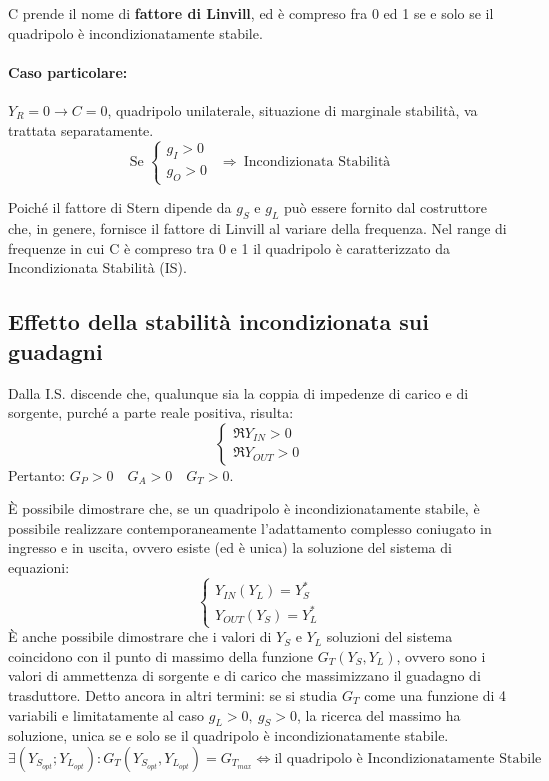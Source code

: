 C prende il nome di  \textbf{fattore di Linvill}, ed è compreso fra 0 ed 1 se e solo se il quadripolo è incondizionatamente stabile.

\paragraph{Caso particolare:} $Y_R =0 \rightarrow C=0$, quadripolo unilaterale,	situazione di marginale stabilità, va trattata separatamente.
$$
\mbox{Se }
\begin{cases}
g_I > 0 \\
g_O > 0
\end{cases}
~~
\Rightarrow
~
\mbox{Incondizionata Stabilità}
$$

	
Poiché il fattore di Stern dipende da $g_S$ e $g_L$ può essere fornito dal costruttore che, in genere,	fornisce il fattore di Linvill al variare della frequenza. Nel range di frequenze in cui C è compreso tra 0 e 1 il quadripolo è caratterizzato da Incondizionata Stabilità (IS).

\subsection{Effetto della stabilità incondizionata sui guadagni}

Dalla I.S. discende che, qualunque sia la coppia di impedenze di carico e di sorgente, purché a parte
reale positiva, risulta:
\[
\begin{cases}
\Re{ Y_{IN} } > 0\\
\Re{ Y_{OUT} } > 0
\end{cases}
\]
Pertanto: $ G_P > 0 \quad G_A > 0 \quad G_T > 0$.

È possibile dimostrare che, se un quadripolo è incondizionatamente stabile, è possibile realizzare contemporaneamente l'adattamento complesso coniugato in ingresso e in uscita, ovvero esiste (ed è unica) la soluzione del sistema di equazioni:
\[
\begin{cases}
Y_{IN} ( Y_L ) = Y_S^*\\
Y_{OUT} ( Y_S ) = Y_L^*
\end{cases}
\]
È anche possibile dimostrare che i valori di $Y_S$ e $Y_L$ soluzioni del sistema coincidono con il punto di massimo della funzione $G_T (Y_S, Y_L)$, ovvero sono i valori di ammettenza di sorgente e di carico che massimizzano il guadagno di trasduttore.
Detto ancora in altri termini: se si studia $G_T$ come una funzione di 4 variabili e limitatamente al caso $g_L >0,~ g_S >0$, la ricerca del massimo ha soluzione, unica se e solo se il quadripolo è incondizionatamente stabile.
\[\exists (Y_{S_{opt}}; Y_{L_{opt}})
: G_T (Y_{S_{opt}}, Y_{L_{opt}}) = G_{T_{max}}
\Leftrightarrow 
\mbox{il quadripolo è Incondizionatamente Stabile}
\]

